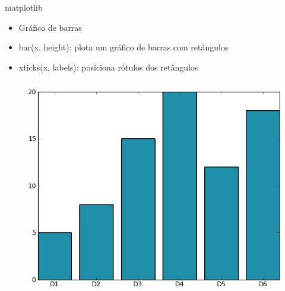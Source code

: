 \documentclass[12pt,t,graphics]{beamer}
\begin{document}
\begin{frame}[t,fragile]{matplotlib}
	\begin{itemize}
		\item Gráfico de barras
		\item bar(x, height): plota um gráfico de barras com retângulos
		\item xticks(x, labels): posiciona rótulos dos retângulos
	\end{itemize}
	\begin{columns}
		
		\begin{figure}
			\centering
			\includegraphics[scale=0.2]{img/plot6.png}
		\end{figure}
	\end{columns}
	
\end{frame}
\end{document}
